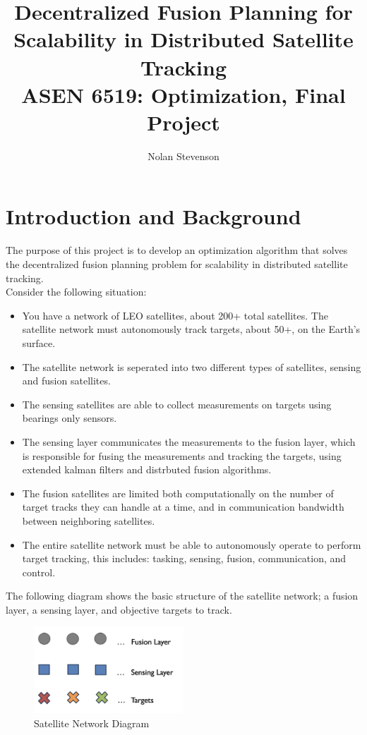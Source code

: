 \documentclass{article}
\title{
Decentralized Fusion Planning for Scalability in Distributed Satellite Tracking\\
{\small ASEN 6519: Optimization, Final Project}}
\author{Nolan Stevenson}
\date{} %
\begin{document}
\maketitle

\newpage
\section{Introduction and Background}

	The purpose of this project is to develop an optimization algorithm that solves the decentralized fusion planning problem for scalability in distributed satellite tracking. 
    \\Consider the following situation:\\
    \begin{itemize}
        \item You have a network of LEO satellites, about 200+ total satellites. The satellite network must autonomously track targets, about 50+, on the Earth's surface.
        \item The satellite network is seperated into two different types of satellites, sensing and fusion satellites.
        \item The sensing satellites are able to collect measurements on targets using bearings only sensors.
        \item The sensing layer communicates the measurements to the fusion layer, which is responsible for fusing the measurements and tracking the targets, using extended kalman filters and distrbuted fusion algorithms.
        \item The fusion satellites are limited both computationally on the number of target tracks they can handle at a time, and in communication bandwidth between neighboring satellites.
        \item The entire satellite network must be able to autonomously operate to perform target tracking, this includes: tasking, sensing, fusion, communication, and control.
    \end{itemize}

    The following diagram shows the basic structure of the satellite network; a fusion layer, a sensing layer, and objective targets to track.
    \begin{figure}[h]
        \centering
        \includegraphics[width=0.5\textwidth]{images/basic_struct.png}
        \caption{Satellite Network Diagram}
        \label{fig:satellite_network}
    \end{figure}
\end{document}
